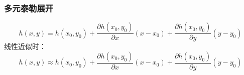 \subsubsection{多元泰勒展开}
\[
h ( x , y ) = h \left( x _ { 0 } , y _ { 0 } \right) + \frac { \partial h \left( x _ { 0 } , y _ { 0 } \right) } { \partial x } \left( x - x _ { 0 } \right) + \frac { \partial h \left( x _ { 0 } , y _ { 0 } \right) } { \partial y } \left( y - y _ { 0 } \right)
\]
线性近似时：
\[
h ( x , y ) \approx h \left( x _ { 0 } , y _ { 0 } \right) + \frac { \partial h \left( x _ { 0 } , y _ { 0 } \right) } { \partial x } \left( x - x _ { 0 } \right) + \frac { \partial h \left( x _ { 0 } , y _ { 0 } \right) } { \partial y } \left( y - y _ { 0 } \right)
\]
